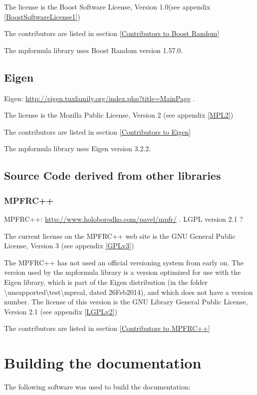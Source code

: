 The license is the Boost Software License, Version 1.0(see appendix \ref{BoostSoftwareLicense1})

The contributors are listed in section \ref{Contributors to Boost Random}

The mpformula library uses Boost Random version 1.57.0.



\subsection{Eigen}
Eigen: \href{http://eigen.tuxfamily.org/index.php?title=Main_Page}{http://eigen.tuxfamily.org/index.php?title=MainPage} . 

The license is the Mozilla Public License, Version 2 (see appendix \ref{MPL2})

The contributors are listed in section \ref{Contributors to Eigen}

The mpformula library uses Eigen version 3.2.2.




\subsection{Source Code derived from other libraries}

\subsubsection{MPFRC++}
MPFRC++: \href{http://www.holoborodko.com/pavel/mpfr/}{http://www.holoborodko.com/pavel/mpfr/} . LGPL version 2.1 ?

The current license on the MPFRC++ web site is the GNU General Public License, Version 3 (see appendix \ref{GPLv3})

The MPFRC++ has not used an official versioning system from early on. The version used by the mpformula library is a version optimized for use with the Eigen library, which is part of the Eigen distribution (in the folder \textbackslash unsupported\textbackslash test\textbackslash mpreal, dated 26Feb2014), and which does not have a version number. The license of this version is the GNU Library General Public License, Version 2.1 (see appendix \ref{LGPLv2})

The contributors are listed in section \ref{Contributors to MPFRC++}



\newpage
\section{Building the documentation}
The following software was used to build the documentation:

